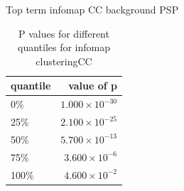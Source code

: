 \begin{table}[ht]
\caption{Top term  infomap CC background PSP} 
\label{tab:Top term  infomap CC background PSP}
\end{table}
\begin{table}[ht]
\centering
\begin{tabular}{lr}
  \hline
quantile & value of p \\ 
  \hline
0\% & $1.000 \times 10^{-30}$ \\ 
  25\% & $2.100 \times 10^{-25}$ \\ 
  50\% & $5.700 \times 10^{-13}$ \\ 
  75\% & $3.600 \times 10^{-6}$ \\ 
  100\% & $4.600 \times 10^{-2}$ \\ 
   \hline
\end{tabular}
\caption{P values for different quantiles for infomap clusteringCC} 
\label{tabP values for different quantiles for infomap clusteringCC}
\end{table}


